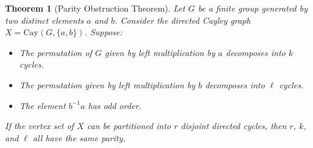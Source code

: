 \documentclass[12pt,a4paper,openany]{book}
\newtheorem{theorem}{Theorem}[section]
\begin{document}
\begin{theorem}[Parity Obstruction Theorem]\label{thm:parity-obstruction}
Let $G$ be a finite group generated by two distinct elements $a$ and $b$. Consider the directed Cayley graph $X = \mathrm{Cay}(G, \{a, b\})$. Suppose:
\begin{itemize}
    \item The permutation of $G$ given by left multiplication by $a$ decomposes into $k$ cycles.
    \item The permutation given by left multiplication by $b$ decomposes into $\ell$ cycles.
    \item The element $b^{-1}a$ has odd order.
\end{itemize}
If the vertex set of $X$ can be partitioned into $r$ disjoint directed cycles, then $r$, $k$, and $\ell$ all have the same parity.
\end{theorem}
\end{document}
